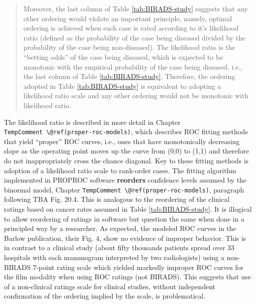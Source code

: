 \documentclass[
]{book}
\begin{document}
\begin{quote}
Moreover, the last column of Table \ref{tab:BIRADS-study} suggests that any other ordering would violate an important principle, namely, optimal ordering is achieved when each case is rated according to it's likelihood ratio (defined as the probability of the case being diseased divided by the probability of the case being non-diseased). The likelihood ratio is the ``betting odds'' of the case being diseased, which is expected to be monotonic with the empirical probability of the case being diseased, i.e., the last column of Table \ref{tab:BIRADS-study}. Therefore, the ordering adopted in Table \ref{tab:BIRADS-study} is equivalent to adopting a likelihood ratio scale and any other ordering would not be monotonic with likelihood ratio.
\end{quote}

The likelihood ratio is described in more detail in Chapter \texttt{TempComment\ \textbackslash{}@ref(proper-roc-models)}, which describes ROC fitting methods that yield ``proper'' ROC curves, i.e., ones that have monotonically decreasing slope as the operating point moves up the curve from (0,0) to (1,1) and therefore do not inappropriately cross the chance diagonal. Key to these fitting methods is adoption of a likelihood ratio scale to rank-order cases. The fitting algorithm implemented in PROPROC software \textbf{reorders} confidence levels assumed by the binormal model, Chapter \texttt{TempComment\ \textbackslash{}@ref(proper-roc-models)}, paragraph following TBA Fig. 20.4. This is analogous to the reordering of the clinical ratings based on cancer rates assumed in Table \ref{tab:BIRADS-study}. It is illogical to allow reordering of ratings in software but question the same when done in a principled way by a researcher. As expected, the modeled ROC curves in the Barlow publication, their Fig. 4, show no evidence of improper behavior. This is in contrast to a clinical study (about fifty thousands patients spread over 33 hospitals with each mammogram interpreted by two radiologists) using a non-BIRADS 7-point rating scale which yielded markedly improper ROC curves \citep{pisano2005diagnostic} for the film modality when using ROC ratings (not BIRADS). This suggests that use of a non-clinical ratings scale for clinical studies, without independent confirmation of the ordering implied by the scale, is problematical.
\end{document}
